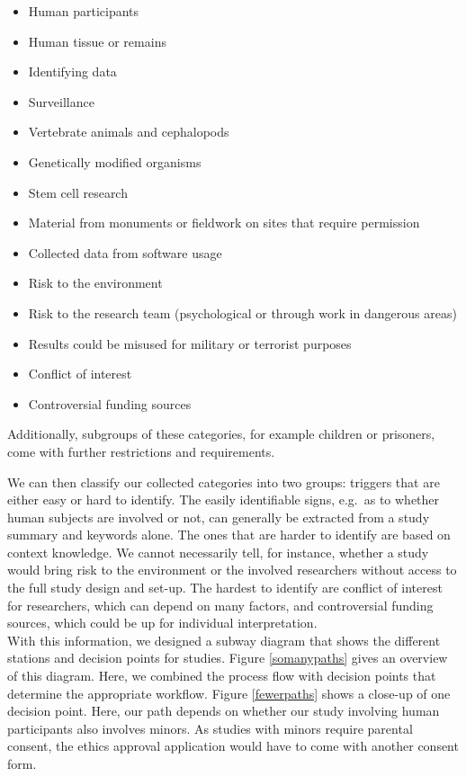 \documentclass[10pt]{article}
\begin{document}
\begin{itemize}
\item Human participants
\item Human tissue or remains
\item Identifying data
\item Surveillance
\item Vertebrate animals and cephalopods
\item Genetically modified organisms
\item Stem cell research
\item Material from monuments or fieldwork on sites that require permission
\item Collected data from software usage
\item Risk to the environment
\item Risk to the research team (psychological or through work in dangerous areas)
\item Results could be misused for military or terrorist purposes
\item Conflict of interest
\item Controversial funding sources
\end{itemize}

Additionally, subgroups of these categories, for example children or prisoners, come with further restrictions and requirements.

We can then classify our collected categories into two groups: triggers that are either easy or hard to identify. The easily identifiable signs, e.g.\ as to whether human subjects are involved or not, can generally be extracted from a study summary and keywords alone. 
The ones that are harder to identify are based on context knowledge. We cannot necessarily tell, for instance, whether a study would bring risk to the environment or the involved researchers without access to the full study design and set-up. The hardest to identify are conflict of interest for researchers, which can depend on many factors, and controversial funding sources, which could be up for individual interpretation. \\

With this information, we designed a subway diagram that shows the different stations and decision points for studies. Figure \ref{somanypaths} gives an overview of this diagram. Here, we combined the process flow with decision points that determine the appropriate workflow. Figure \ref{fewerpaths} shows a close-up of one decision point. Here, our path depends on whether our study involving human participants also involves minors. As studies with minors require parental consent, the ethics approval application would have to come with another consent form. 
\end{document}
